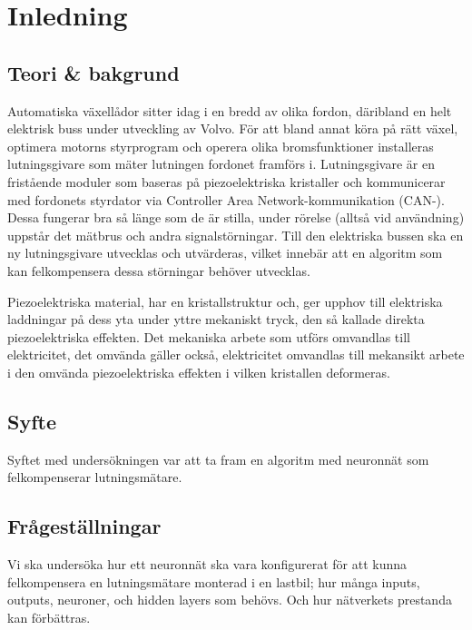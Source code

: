 \section{Inledning}
\subsection{Teori \& bakgrund}

Automatiska växellådor sitter idag i en bredd av olika fordon, däribland en
helt elektrisk buss under utveckling av Volvo.
För att bland annat köra på rätt växel, optimera motorns styrprogram och operera
olika bromsfunktioner %
installeras lutningsgivare som mäter lutningen fordonet framförs i.
Lutningsgivare är en fristående moduler som baseras på piezoelektriska
kristaller och kommunicerar med fordonets styrdator via Controller
Area Network-kommunikation (CAN-).
Dessa fungerar bra så länge som de är stilla, under rörelse (alltså vid
användning)  uppstår det mätbrus och andra signalstörningar.
Till den elektriska bussen ska en ny lutningsgivare utvecklas och utvärderas,
vilket innebär att en algoritm som kan felkompensera dessa störningar behöver
utvecklas.


Piezoelektriska material, har en kristallstruktur och, ger upphov till
elektriska laddningar på dess yta under yttre mekaniskt tryck, den så kallade
direkta piezoelektriska effekten.
Det mekaniska arbete som utförs omvandlas till elektricitet, det omvända gäller
också, elektricitet omvandlas till mekansikt arbete i den omvända
piezoelektriska effekten i vilken kristallen deformeras.
\autocite{electronicdesign2016}

\subsection{Syfte}
Syftet med  undersökningen var att ta fram en algoritm med neuronnät som
felkompenserar lutningsmätare.

\subsection{Frågeställningar}
Vi ska undersöka hur ett neuronnät ska vara konfigurerat för att kunna
felkompensera en lutningsmätare monterad i en lastbil; hur många inputs,
outputs, neuroner, och hidden layers som behövs.
Och hur nätverkets prestanda kan förbättras.
